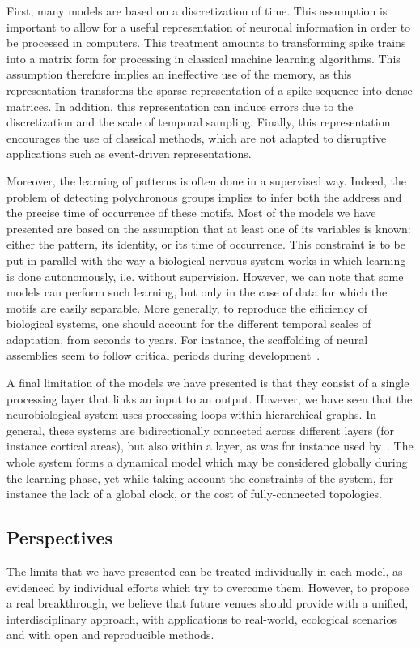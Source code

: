 \documentclass[brainsci, %
               review,submit,pdftex,moreauthors
               ]{Definitions/mdpi}
\begin{document}
First, many models are based on a discretization of time. This assumption is important to allow for a useful representation of neuronal information in order to be processed in computers. This treatment amounts to transforming spike trains into a matrix form for processing in classical machine learning algorithms. This assumption therefore implies an ineffective use of the memory, as this representation transforms the sparse representation of a spike sequence into dense matrices. In addition, this representation can induce errors due to the discretization and the scale of temporal sampling. Finally, this representation encourages the use of classical methods, which are not adapted to disruptive applications such as event-driven representations.

Moreover, the learning of patterns is often done in a supervised way. Indeed, the problem of detecting polychronous groups implies to infer both the address and the precise time of occurrence of these motifs. Most of the models we have presented are based on the assumption that at least one of its variables is known: either the pattern, its identity, or its time of occurrence. This constraint is to be put in parallel with the way a biological nervous system works in which learning is done autonomously, i.e. without supervision. However, we can note that some models can perform such learning, but only in the case of data for which the motifs are easily separable. More generally, to reproduce the efficiency of biological systems, one should account for the different temporal scales of adaptation, from seconds to years. For instance, the scaffolding of neural assemblies seem to follow critical periods during development~\citep{dard_rapid_2022}.

A final limitation of the models we have presented is that they consist of a single processing layer that links an input to an output. However, we have seen that the neurobiological system uses processing loops within hierarchical graphs. In general, these systems are bidirectionally connected across different layers (for instance cortical areas), but also within a layer, as was for instance used by~\citet{izhikevich_polychronization_2006}. The whole system forms a dynamical model which may be considered globally during the learning phase, yet while taking account the constraints of the system, for instance the lack of a global clock, or the cost of fully-connected topologies.
%
\subsection{Perspectives}
%
The limits that we have presented can be treated individually in each model, as evidenced by individual efforts which try to overcome them. However, to propose a real breakthrough, we believe that future venues should provide with a unified, interdisciplinary approach, with applications to real-world, ecological scenarios and with open and reproducible methods. 
\end{document}
